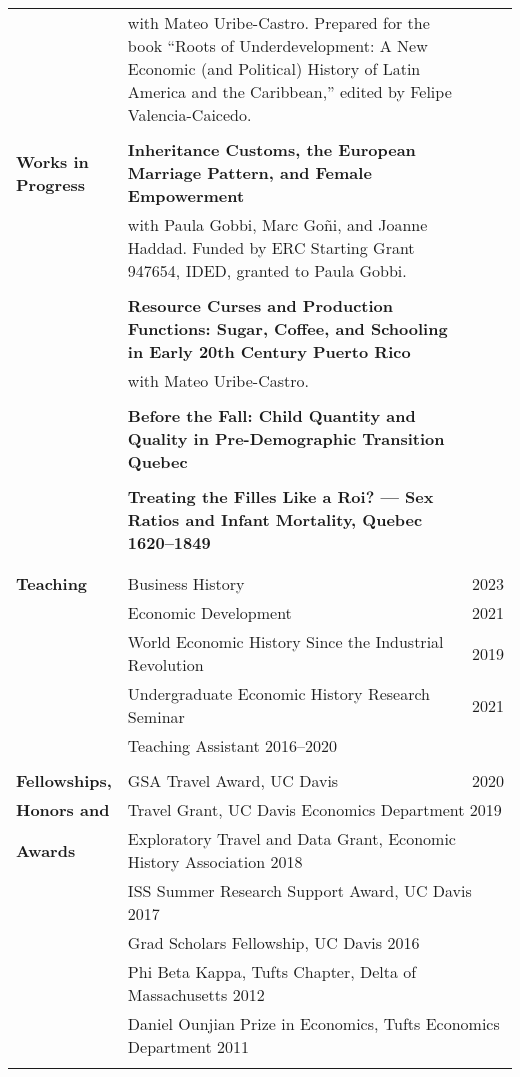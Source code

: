 \documentclass[a4paper,11pt,oneside]{article}
\begin{document}
\begin{longtable}{@{} p{0.175\linewidth} p{0.775\linewidth} p{0.05\linewidth}}
   & with Mateo Uribe-Castro. Prepared for the book ``Roots of Underdevelopment: A New Economic (and Political) History of Latin America and the Caribbean,'' edited by Felipe Valencia-Caicedo. & \\
   \\
   
   
   
   \textbf{\large{Works in \(\phantom{1}\) Progress}}           & \textbf{Inheritance Customs, the European Marriage Pattern, and Female Empowerment}\\ 
   &  with Paula Gobbi, Marc Go\~{n}i, and Joanne Haddad. Funded by ERC Starting Grant 947654, IDED, granted to Paula Gobbi. &  \\
   \\
   &  \textbf{Resource Curses and Production Functions: Sugar, Coffee, and Schooling in Early 20th Century Puerto Rico} \\ 
   &  with  Mateo Uribe-Castro. \\
   \\
   &  \textbf{Before the Fall: Child Quantity and Quality in
   Pre-Demographic Transition Quebec} \\ 
   &   \\
   &  \textbf{Treating the Filles Like a Roi? --- Sex Ratios and Infant Mortality, Quebec 1620--1849} \\ 
   &   \\
   \\
   
   
   \textbf{\large{Teaching}}  & Business History & \hfill 2023 \\
   & Economic Development & \hfill 2021\\
   &  World Economic History Since the Industrial Revolution &\hfill 2019\\
   & Undergraduate Economic History Research Seminar & \hfill  2021 \\
   & Teaching Assistant 2016--2020\\
   
   \\
   
   \textbf{\large{Fellowships,}}   &  GSA Travel Award, UC Davis & \hfill  2020\\
   \textbf{\large{Honors and }}   &  \multicolumn{2}{l}{ Travel Grant, UC Davis Economics Department \hfill 2019}\\  
   \textbf{\large{Awards}}  &  \multicolumn{2}{l}{ Exploratory Travel and Data Grant, Economic History Association \hfill 2018}\\
   &  \multicolumn{2}{l}{ ISS Summer Research Support Award, UC Davis \hfill 2017}\\
   &  \multicolumn{2}{l}{ Grad Scholars Fellowship, UC Davis \hfill  2016}\\
   &  \multicolumn{2}{l}{ Phi Beta Kappa, Tufts Chapter, Delta of Massachusetts \hfill 2012}\\
   &   \multicolumn{2}{l}{ Daniel Ounjian Prize in Economics, Tufts Economics Department \hfill 2011}\\
   \\
   

\end{longtable}
\end{document}
